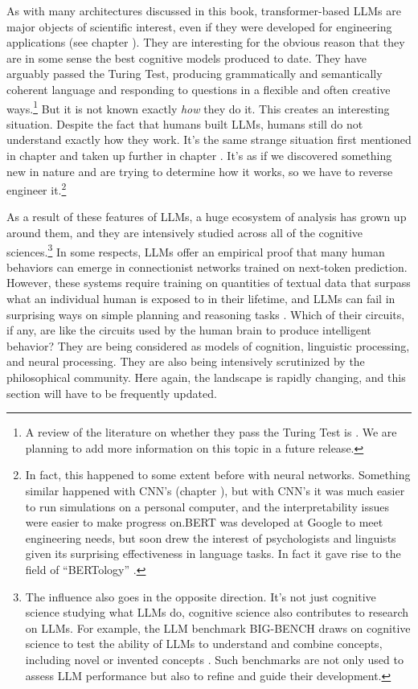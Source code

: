 As with many architectures discussed in this book, transformer-based LLMs are
major objects of scientific interest, even if they were developed for
engineering applications (see chapter ). They are
interesting for the obvious reason that they are in some sense the best
cognitive models produced to date. They have arguably passed the Turing Test,
producing grammatically and semantically coherent language and responding to
questions in a flexible and often creative ways.\footnote{A review of the
literature on whether they pass the Turing Test is \cite{jones2024does}. We are
planning to add more information on this topic in a future release.} But it is
not known exactly \emph{how} they do it. This creates an interesting situation.
Despite the fact that humans built LLMs, humans still do not understand exactly
how they work. It's the same strange situation first mentioned in chapter
 and taken up further in chapter
. It's as if we discovered something new in nature and
are trying to determine how it works, so we have to  reverse engineer
it.\footnote{In fact, this happened  to some extent before with neural
networks. Something similar happened with CNN's (chapter ), but
with CNN's it was much easier to  run simulations on a personal computer, and
the interpretability issues were easier to make progress on.BERT was developed
at Google to meet engineering needs, but soon drew the interest of
psychologists and linguists given its surprising effectiveness in language
tasks. In fact it gave rise to the field of  ``BERTology''
\cite{rogers2020primer}.}

As a result of these features of LLMs, a huge ecosystem of analysis has grown
up around them, and they are intensively studied across all of the cognitive
sciences.\footnote{The influence also goes in the opposite direction. It's not
just cognitive science studying what LLMs do, cognitive science also
contributes to research on LLMs. For example, the LLM benchmark BIG-BENCH draws
on cognitive science to test the ability of LLMs to understand and combine
concepts, including novel or invented concepts \cite{srivastava2022beyond}.
Such benchmarks are not only used to assess LLM performance but also to refine
and guide their development.} In some respects, LLMs offer an empirical proof
that many human behaviors can emerge in connectionist networks trained on
next-token prediction. However, these systems require training on quantities of
textual data that surpass what an individual human is exposed to in their
lifetime, and LLMs can fail in surprising ways on simple planning and reasoning
tasks \cite{momennejad2023cogeval}. Which of their circuits, if any, are like the
circuits used by the human brain to produce intelligent behavior? They are
being considered as models of cognition, linguistic processing, and neural
processing. They are also being intensively scrutinized by the philosophical
community. Here again, the landscape is rapidly changing, and this section will
have to be frequently updated.

